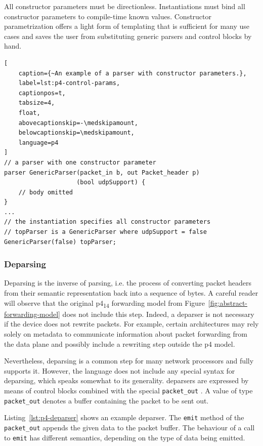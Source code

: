 All constructor parameters must be directionless. Instantiations must bind all
constructor parameters to compile-time known values. Constructor parametrization
offers a light form of templating that is sufficient for many use cases and
saves the user from substituting generic parsers and control blocks by hand.

\begin{lstlisting}[
	caption={~An example of a parser with constructor parameters.},
	label=lst:p4-control-params,
	captionpos=t,
	tabsize=4,
	float,
	abovecaptionskip=-\medskipamount,
	belowcaptionskip=\medskipamount,
	language=p4
]
// a parser with one constructor parameter
parser GenericParser(packet_in b, out Packet_header p)
                    (bool udpSupport) {
	// body omitted
}
...
// the instantiation specifies all constructor parameters
// topParser is a GenericParser where udpSupport = false
GenericParser(false) topParser;
\end{lstlisting}


\subsubsection*{Deparsing}

Deparsing is the inverse of parsing, i.e. the process of converting packet
headers from their semantic representation back into a sequence of bytes. A
careful reader will observe that the original \acrshort{p4}\textsubscript{14}
forwarding model from Figure~\ref{fig:abstract-forwarding-model} does not
include this step. Indeed, a deparser is not necessary if the device does not
rewrite packets. For example, certain architectures may rely solely on metadata
to communicate information about packet forwarding from the data plane and
possibly include a rewriting step outside the \acrshort{p4} model.

Nevertheless, deparsing is a common step for many network processors and \pfs
fully supports it. However, the language does not include any special syntax for
deparsing, which speaks somewhat to its generality. \pfs deparsers are expressed
by means of control blocks combined with the special \texttt{packet\_out}
\extern. A value of type \texttt{packet\_out} denotes a buffer containing the
packet to be sent out.

Listing~\ref{lst:p4-deparser} shows an example deparser. The \texttt{emit}
method of the \texttt{packet\_out} \extern appends the given data to the packet
buffer. The behaviour of a call to \texttt{emit} has different semantics,
depending on the type of data being emitted.

